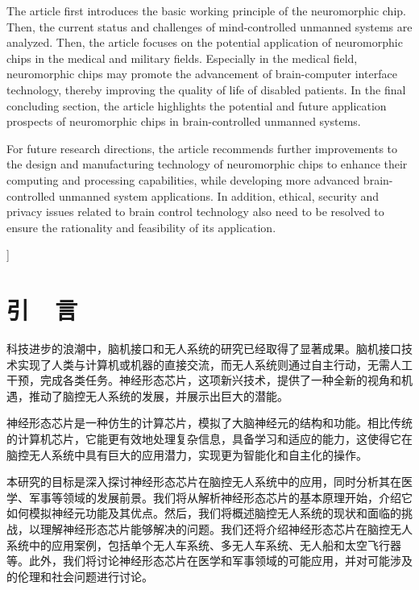 \documentclass{thuemp}
\begin{document}
\begin{@twocolumnfalse}
\begin{empAbstractEn}
  The article first introduces the basic working principle of the neuromorphic chip. Then, the current status and challenges of mind-controlled unmanned systems are analyzed. Then, the article focuses on the potential application of neuromorphic chips in the medical and military fields. Especially in the medical field, neuromorphic chips may promote the advancement of brain-computer interface technology, thereby improving the quality of life of disabled patients. In the final concluding section, the article highlights the potential and future application prospects of neuromorphic chips in brain-controlled unmanned systems.
 
  For future research directions, the article recommends further improvements to the design and manufacturing technology of neuromorphic chips to enhance their computing and processing capabilities, while developing more advanced brain-controlled unmanned system applications. In addition, ethical, security and privacy issues related to brain control technology also need to be resolved to ensure the rationality and feasibility of its application.
\end{empAbstractEn}

\end{@twocolumnfalse}
]
\wuhao 

\section{引~~言}
科技进步的浪潮中，脑机接口和无人系统的研究已经取得了显著成果。脑机接口技术实现了人类与计算机或机器的直接交流，而无人系统则通过自主行动，无需人工干预，完成各类任务。神经形态芯片，这项新兴技术，提供了一种全新的视角和机遇，推动了脑控无人系统的发展，并展示出巨大的潜能。

神经形态芯片是一种仿生的计算芯片，模拟了大脑神经元的结构和功能。相比传统的计算机芯片，它能更有效地处理复杂信息，具备学习和适应的能力，这使得它在脑控无人系统中具有巨大的应用潜力，实现更为智能化和自主化的操作。

本研究的目标是深入探讨神经形态芯片在脑控无人系统中的应用，同时分析其在医学、军事等领域的发展前景。我们将从解析神经形态芯片的基本原理开始，介绍它如何模拟神经元功能及其优点。然后，我们将概述脑控无人系统的现状和面临的挑战，以理解神经形态芯片能够解决的问题。我们还将介绍神经形态芯片在脑控无人系统中的应用案例，包括单个无人车系统、多无人车系统、无人船和太空飞行器等。此外，我们将讨论神经形态芯片在医学和军事领域的可能应用，并对可能涉及的伦理和社会问题进行讨论。
\end{document}
